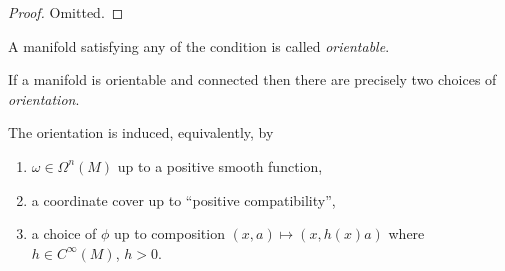 \documentclass[a4paper]{article}
\begin{document}
\begin{proof}
  Omitted.
\end{proof}

\begin{definition}[orientability]
  A manifold satisfying any of the condition is called \emph{orientable}.

  If a manifold is orientable and connected then there are precisely two choices of \emph{orientation}.
\end{definition}

The orientation is induced, equivalently, by
\begin{enumerate}
\item \(\omega \in \Omega^n(M)\) up to a positive smooth function,
\item a coordinate cover up to ``positive compatibility'',
\item a choice of \(\phi\) up to composition \((x, a) \mapsto (x, h(x) a)\) where \(h \in C^\infty(M)\), \(h > 0\).
\end{enumerate}














\printindex
\end{document}
